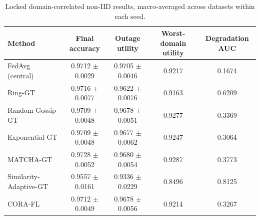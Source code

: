\begin{table}[t]
\centering
\caption{Locked domain-correlated non-IID results, macro-averaged across datasets within each seed.}
\label{tab:confirmatory_performance}
\small
\begin{tabular}{lcccc}
\toprule
Method & Final accuracy & Outage utility & Worst-domain utility & Degradation AUC \\
\midrule
FedAvg (central) & 0.9712 $\pm$ 0.0029 & 0.9705 $\pm$ 0.0046 & 0.9217 & 0.1674 \\
Ring-GT & 0.9716 $\pm$ 0.0077 & 0.9622 $\pm$ 0.0076 & 0.9163 & 0.6209 \\
Random-Gossip-GT & 0.9709 $\pm$ 0.0048 & 0.9678 $\pm$ 0.0051 & 0.9277 & 0.3369 \\
Exponential-GT & 0.9709 $\pm$ 0.0048 & 0.9677 $\pm$ 0.0062 & 0.9247 & 0.3064 \\
MATCHA-GT & 0.9728 $\pm$ 0.0052 & 0.9680 $\pm$ 0.0054 & 0.9287 & 0.3773 \\
Similarity-Adaptive-GT & 0.9557 $\pm$ 0.0161 & 0.9336 $\pm$ 0.0229 & 0.8496 & 0.8125 \\
CORA-FL & 0.9712 $\pm$ 0.0049 & 0.9678 $\pm$ 0.0056 & 0.9214 & 0.3267 \\
\bottomrule
\end{tabular}
\end{table}
